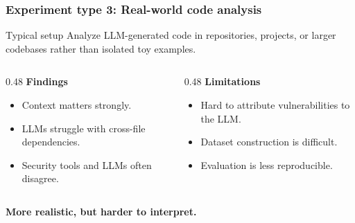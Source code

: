 
\begin{frame}
\frametitle{Experiment type 3: Real-world code analysis}

\begin{block}{Typical setup}
Analyze LLM-generated code in repositories, projects, or larger codebases rather than isolated toy examples.
\end{block}

\medskip

\begin{columns}[T]
\begin{column}{0.48\textwidth}
\textbf{Findings}
\begin{itemize}
    \item Context matters strongly.
    \item LLMs struggle with cross-file dependencies.
    \item Security tools and LLMs often disagree.
\end{itemize}
\end{column}

\begin{column}{0.48\textwidth}
\textbf{Limitations}
\begin{itemize}
    \item Hard to attribute vulnerabilities to the LLM.
    \item Dataset construction is difficult.
    \item Evaluation is less reproducible.
\end{itemize}
\end{column}
\end{columns}

\bigskip
\centering
\textbf{More realistic, but harder to interpret.}

\end{frame}


